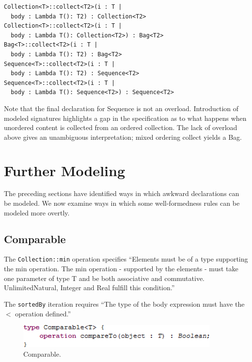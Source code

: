 \documentclass{eceasst}
\begin{document}
\begin{verbatim}
Collection<T>::collect<T2>(i : T |
  body : Lambda T(): T2) : Collection<T2>
Collection<T>::collect<T2>(i : T |
  body : Lambda T(): Collection<T2>) : Bag<T2>
Bag<T>::collect<T2>(i : T |
  body : Lambda T(): T2) : Bag<T2>
Sequence<T>::collect<T2>(i : T |
  body : Lambda T(): T2) : Sequence<T2>
Sequence<T>::collect<T2>(i : T |
  body : Lambda T(): Sequence<T2>) : Sequence<T2>
\end{verbatim}

Note that the final declaration for Sequence is not an overload. Introduction of modeled signatures highlights a gap in the specification as to what happens when unordered content is collected from an ordered collection. The lack of overload above gives an unambiguous interpretation; mixed ordering collect yields a Bag.

\section{Further Modeling}\label{FurtherModeling}

The preceding sections have identified ways in which awkward declarations can be modeled. We now examine ways in which some well-formedness rules can be modeled more overtly.

\subsection{Comparable}

The \verb|Collection::min| operation specifies ``Elements must be of a type supporting the min operation. The min operation - supported by the elements - must take one parameter of type T and be both associative and commutative. UnlimitedNatural, Integer and Real fulfill this condition.''

The \verb|sortedBy| iteration requires ``The type of the body expression must have the $<$ operation defined.''

\begin{figure}
  \begin{center}
    \includegraphics[width=4.0in]{Comparable.png}
  \end{center}
  \caption{Comparable.}
  \label{fig:Comparable}
\end{figure}
\end{document}
